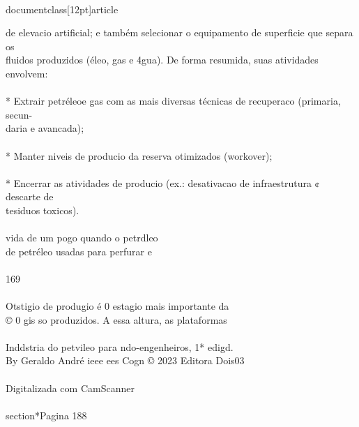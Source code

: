 \\documentclass[12pt]{article}
\begin{document}
de elevacio artificial; e também selecionar o equipamento de superficie que separa os\\
fluidos produzidos (éleo, gas e 4gua). De forma resumida, suas atividades envolvem:\\
\\
* Extrair petréleoe gas com as mais diversas técnicas de recuperaco (primaria, secun-\\
daria e avancada);\\
\\
* Manter niveis de producio da reserva otimizados (workover);\\
\\
* Encerrar as atividades de producio (ex.: desativacao de infraestrutura ¢ descarte de\\
tesiduos toxicos).\\
\\
vida de um pogo quando o petrdleo\\
de petréleo usadas para perfurar e\\
\\
169\\
\\
Otstigio de produgio é 0 estagio mais importante da\\
© 0 gis so produzidos. A essa altura, as plataformas\\
\\
Inddstria do petvileo para ndo-engenheiros, 1* edigd.\\
By Geraldo André ieee ees Cogn © 2023 Editora Dois03\\
\\
Digitalizada com CamScanner\\

\\section*{Pagina 188}
\end{document}
